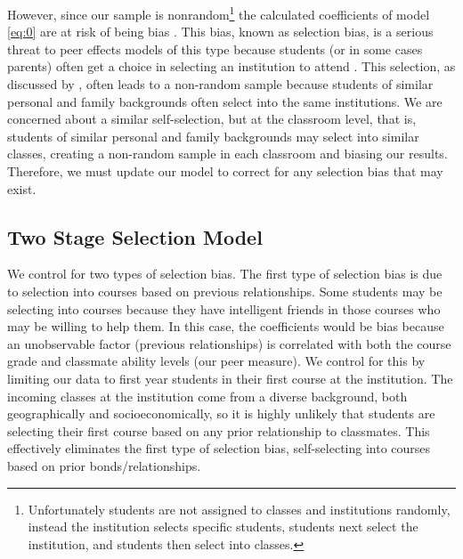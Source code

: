 However, since our sample is nonrandom\footnote{Unfortunately students are not assigned to classes and institutions randomly, instead the institution selects specific students, students next select the institution, and students then select into classes.} the calculated coefficients of model \eqref{eq:0} are at risk of being bias \citep{heckman1979sample}.  
This bias, known as selection bias, is a serious threat to peer effects models of this type because students (or in some cases parents) often get a choice in selecting an institution to attend \citep{carman2012classroom,burke2013classroom,ding2007peers}. 
This selection, as discussed by \citet{kang2007classroom}, often leads to a non-random sample because students of similar personal and family backgrounds often select into the same institutions.
We are concerned about a similar self-selection, but at the classroom level, that is, students of similar personal and family backgrounds may select into similar classes, creating a non-random sample in each classroom and biasing our results.
Therefore, we must update our model to correct for any selection bias that may exist.

\subsection{Two Stage Selection Model}\label{methods:tssmodel}

We control for two types of selection bias. 
The first type of selection bias is due to selection into courses based on previous relationships. 
Some students may be selecting into courses because they have intelligent friends in those courses who may be willing to help them.
In this case, the coefficients would be bias because an unobservable factor (previous relationships) is correlated with both the course grade and classmate ability levels (our peer measure). 
We control for this by limiting our data to first year students in their first course at the institution.
The incoming classes at the institution come from a diverse background, both geographically and socioeconomically, so it is highly unlikely that students are selecting their first course based on any prior relationship to classmates.
This effectively eliminates the first type of selection bias, self-selecting into courses based on prior bonds/relationships.

